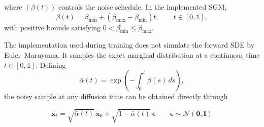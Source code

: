 where $(\beta(t))$ controls the noise schedule. In the implemented SGM,
\[
\beta(t)=\beta_{\min}+(\beta_{\max}-\beta_{\min})t,
\qquad t\in[0,\mathds{1}],
\]
with positive bounds satisfying $0<\beta_{\min}\leq\beta_{\max}$.

The implementation used during training does not simulate the forward SDE by Euler--Maruyama. It samples the exact marginal distribution at a continuous time $t\in[0,\mathds{1}]$. Defining
\begin{equation}
\bar{\alpha}(t)
=
\exp\left(-\int_0^t \beta(s)\,ds\right),
\end{equation}
the noisy sample at any diffusion time can be obtained directly through

\begin{equation}
\mathbf{x}_t
=
\sqrt{\bar{\alpha}(t)}\,\mathbf{x}_0
+
\sqrt{1-\bar{\alpha}(t)}\,
\boldsymbol{\epsilon}
\qquad
\boldsymbol{\epsilon}
\sim
\mathcal{N}(\mathbf{0},\mathbf{I})
\label{eq:x_t}
\end{equation}

